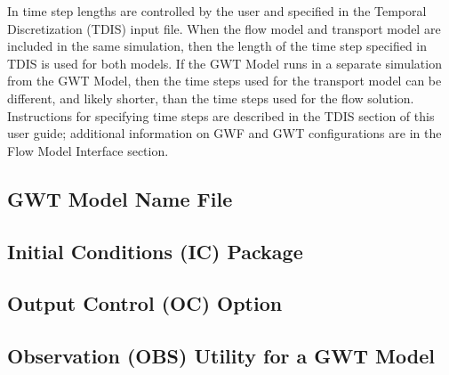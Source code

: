 In \mf time step lengths are controlled by the user and specified in the Temporal Discretization (TDIS) input file.  When the flow model and transport model are included in the same simulation, then the length of the time step specified in TDIS is used for both models.  If the GWT Model runs in a separate simulation from the GWT Model, then the time steps used for the transport model can be different, and likely shorter, than the time steps used for the flow solution.  Instructions for specifying time steps are described in the TDIS section of this user guide; additional information on GWF and GWT configurations are in the Flow Model Interface section.  



\newpage
\subsection{GWT Model Name File}


%

%

%

\newpage
\subsection{Initial Conditions (IC) Package}


\newpage
\subsection{Output Control (OC) Option}


\newpage
\subsection{Observation (OBS) Utility for a GWT Model}


